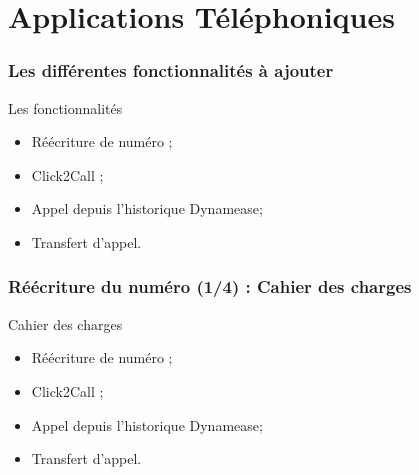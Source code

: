 \section{Applications Téléphoniques}
\author{Kévin Moreau}


\begin{frame}
	\frametitle{Les différentes fonctionnalités à ajouter}

	\begin{block}{Les fonctionnalités}
	 \begin{itemize}
      \item Réécriture de numéro ;
	  \item Click2Call ;
	  \item Appel depuis l'historique Dynamease;
	  \item Transfert d'appel.
	 \end{itemize}
	\end{block}
\end{frame}

\begin{frame}
	\frametitle{Réécriture du numéro (1/4) : Cahier des charges}

	\begin{block}{Cahier des charges}
	 \begin{itemize}
      \item Réécriture de numéro ;
	  \item Click2Call ;
	  \item Appel depuis l'historique Dynamease;
	  \item Transfert d'appel.
	 \end{itemize}
	\end{block}
\end{frame}

